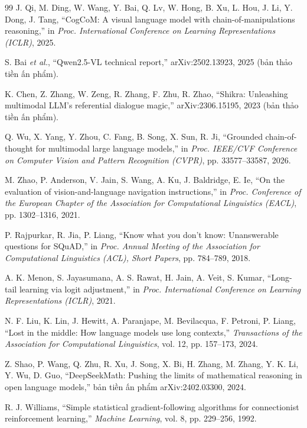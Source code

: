 \begin{thebibliography}{99}
 J. Qi, M. Ding, W. Wang, Y. Bai, Q. Lv, W. Hong, B. Xu, L. Hou,
J. Li, Y. Dong, J. Tang, ``CogCoM: A visual language model with chain-of-manipulations reasoning,'' in
\emph{Proc. International Conference on Learning Representations (ICLR)}, 2025.

 S. Bai \emph{et al.}, ``Qwen2.5-VL technical report,''
arXiv:2502.13923, 2025 (bản thảo tiền ấn phẩm).

 K. Chen, Z. Zhang, W. Zeng, R. Zhang, F. Zhu, R. Zhao, ``Shikra:
Unleashing multimodal LLM's referential dialogue magic,'' arXiv:2306.15195, 2023 (bản
thảo tiền ấn phẩm).

 Q. Wu, X. Yang, Y. Zhou, C. Fang, B. Song, X. Sun, R. Ji, ``Grounded
chain-of-thought for multimodal large language models,'' in \emph{Proc. IEEE/CVF Conference
on Computer Vision and Pattern Recognition (CVPR)}, pp. 33577--33587, 2026.

 M. Zhao, P. Anderson, V. Jain, S. Wang, A. Ku, J. Baldridge, E. Ie,
``On the evaluation of vision-and-language navigation instructions,'' in \emph{Proc.
Conference of the European Chapter of the Association for Computational Linguistics
(EACL)}, pp. 1302--1316, 2021.

 P. Rajpurkar, R. Jia, P. Liang, ``Know what you don't know:
Unanswerable questions for SQuAD,'' in \emph{Proc. Annual Meeting of the Association for
Computational Linguistics (ACL), Short Papers}, pp. 784--789, 2018.

 A. K. Menon, S. Jayasumana, A. S. Rawat, H. Jain, A. Veit, S. Kumar,
``Long-tail learning via logit adjustment,'' in \emph{Proc. International Conference on
Learning Representations (ICLR)}, 2021.

 N. F. Liu, K. Lin, J. Hewitt, A. Paranjape, M. Bevilacqua,
F. Petroni, P. Liang, ``Lost in the middle: How language models use long contexts,''
\emph{Transactions of the Association for Computational Linguistics}, vol. 12,
pp. 157--173, 2024.

 Z. Shao, P. Wang, Q. Zhu, R. Xu, J. Song, X. Bi, H. Zhang, M. Zhang,
Y. K. Li, Y. Wu, D. Guo, ``DeepSeekMath: Pushing the limits of mathematical reasoning in open
language models,'' bản tiền ấn phẩm arXiv:2402.03300, 2024.

 R. J. Williams, ``Simple statistical gradient-following algorithms for
connectionist reinforcement learning,'' \emph{Machine Learning}, vol. 8, pp. 229--256, 1992.


\end{thebibliography}
